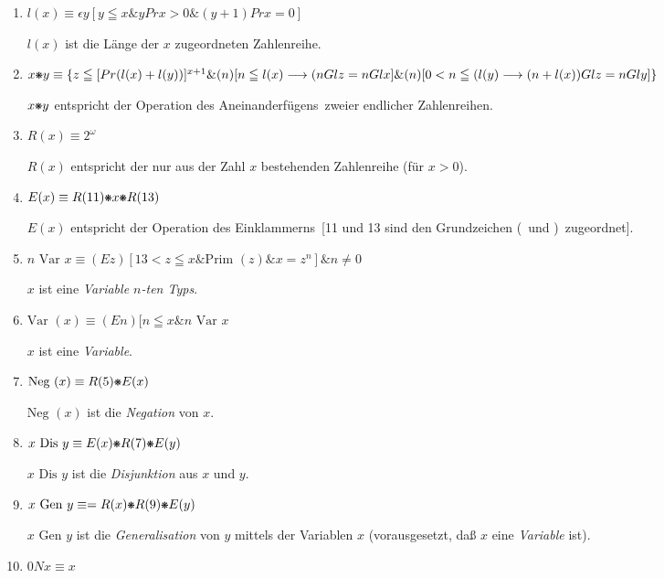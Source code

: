 \documentclass{scrartcl}
\DeclareRobustCommand*{\pmstar}{%
  \text{%
      \resizebox{!}{.75\height}{\ding{107}}%
        }%
}
\begin{document}
\begin{enumerate}[1.]
	\item $l(x) \equiv \epsilon y [y \leqq x \& y Pr x > 0 \&(y + 1) Pr x = 0]$

	$l(x)$ ist die Länge der $x$ zugeordneten Zahlenreihe.

	\item $x \pmstar y \equiv \{ z \leqq [ Pr (l(x) + l(y))]^{x + 1} \& 
	(n) [n \leqq l(x) \longrightarrow (n Gl z = n Gl x] \&
	(n) [0 < n \leqq (l(y) \longrightarrow (n + l(x)) Gl z = n Gl y]\}$

	$x \pmstar y$ entspricht der Operation des
	\glqq Aneinanderfügens\grqq\ zweier endlicher
	Zahlenreihen.

	\item $R(x) \equiv 2^\omega$

	$R(x)$ entspricht der nur aus der Zahl $x$ bestehenden Zahlenreihe (für $x > 0$).

	\item $E(x) \equiv R(11) \pmstar x \pmstar R(13)$

	$E(x)$ entspricht der Operation des \glqq Einklammerns\grqq\ [11 und 13 sind den Grundzeichen
	\glqq(\grqq\ und \glqq)\grqq\ zugeordnet].

	\item $n\text{ Var } x \equiv (Ez)[13 < z \leqq x \& \text{Prim }(z) \& x = z^n] \& n \not = 0$

	$x$ ist eine \textit{Variable $n$-ten Typs}.

	\item $\text{Var }(x) \equiv (En)[n \leqq x \& n \text{ Var } x$

	$x$ ist eine \textit{Variable}.

	\item $\text{Neg }(x) \equiv R(5) \pmstar E(x)$

	$\text{Neg }(x)$ ist die \textit{Negation} von
	$x$.

	\item $x \text{ Dis } y \equiv E(x) \pmstar R(7) \pmstar E(y)$

	$x \text{ Dis } y$ ist die \textit{Disjunktion} aus $x$ und $y$.

	\item $x \text{ Gen } y \equiv = R(x) \pmstar R(9) \pmstar E(y)$

	$x \text{ Gen } y$ ist die \textit{Generalisation} von $y$ mittels der Variablen $x$ (vorausgesetzt, daß $x$ eine \textit{Variable} ist).

	\item $0 N x \equiv x$


\end{enumerate}
\end{document}
